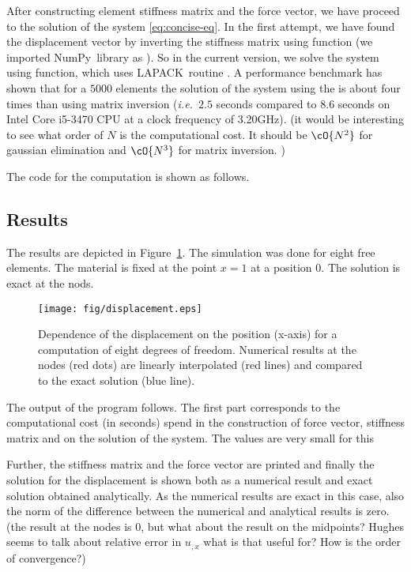 \documentclass[twoside,a4paper,12pt]{article}
\newcommand{\figref}[1]{Figure~\ref{#1}}
\newcommand{\prog}[1]{\textsf{#1}}
\newcommand{\numpy}{\prog{NumPy}}
\newcommand{\lapack}{\prog{LAPACK}}
\newcommand{\ie}{{\it i.e.\ }}
\newcommand{\note}[1]{{\color{red}(#1)}}
\begin{document}
After constructing element stiffness matrix and the force vector, we
have proceed to the solution of the system \eqref{eq:concise-eq}. In
the first attempt, we have found the displacement vector by inverting
the stiffness matrix using  function (we imported
\numpy\ library as ). So in the current version, we
solve the system using  function, which uses
\lapack\ routine . A performance benchmark has shown
that for a $5000$ elements the solution of the system using the
 is about four times than using matrix inversion
(\ie $2.5$ seconds compared to $8.6$ seconds on Intel Core i5-3470 CPU
at a clock frequency of 3.20GHz).
%
\note{it would be interesting to see what order of $N$ is the
  computational cost. It should be $\cO{N^2}$ for gaussian elimination
  and $\cO{N^3}$ for matrix inversion. }

The code for the computation is shown as follows.




\subsection{Results}

The results are depicted in \figref{fig:displacement}. The simulation
was done for eight free elements. The material is fixed at the point
$x=1$ at a position $0$. The solution is exact at the nods.

\begin{figure}
  \centering
  \texttt{[image: fig/displacement.eps]}
  \caption{Dependence of the displacement on the position (x-axis) for
    a computation of eight degrees of freedom. Numerical results at
    the nodes (red dots) are linearly interpolated (red lines) and
    compared to the exact solution (blue line).}
  \label{fig:displacement}
\end{figure}

The output of the program follows.
%
The first part corresponds to the computational cost (in seconds)
spend in the construction of force vector, stiffness matrix and on the
solution of the system. The values are very small for this

Further, the stiffness matrix and the force vector are printed and
finally the solution for the displacement is shown both as a numerical
result and exact solution obtained analytically. As the numerical
results are exact in this case, also the norm of the difference
between the numerical and analytical results is zero.
%
\note{the result at the nodes is 0, but what about the result on the
  midpoints? Hughes seems to talk about relative error in $u_{,x}$
  what is that useful for?  How is the order of convergence?}
\end{document}
